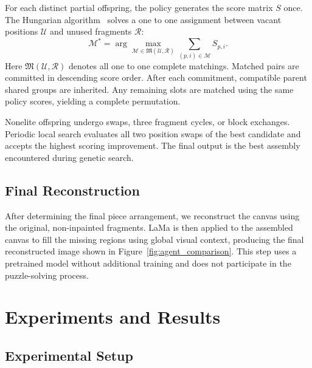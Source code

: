 \documentclass[10pt,twocolumn,letterpaper]{article}
\begin{document}
\par{}
For each distinct partial offspring, the policy generates the score matrix $S$ once. The Hungarian algorithm~\cite{kuhn1955hungarian} solves a one to one assignment between vacant positions $\mathcal U$ and unused fragments $\mathcal R$:
\begin{equation}
\mathcal M^*=\arg\max_{\mathcal M\in\mathfrak M(\mathcal U,\mathcal R)}
\sum_{(p,i)\in\mathcal M}S_{p,i}.
\label{eq:gp-hungarian}
\end{equation}
Here $\mathfrak M(\mathcal U,\mathcal R)$ denotes all one to one complete matchings. Matched pairs are committed in descending score order. After each commitment, compatible parent shared groups are inherited. Any remaining slots are matched using the same policy scores, yielding a complete permutation.

\par{}
Nonelite offspring undergo swaps, three fragment cycles, or block exchanges. Periodic local search evaluates all two position swaps of the best candidate and accepts the highest scoring improvement. The final output is the best assembly encountered during genetic search.

\subsection{Final Reconstruction}
After determining the final piece arrangement, we reconstruct the canvas using the original, non-inpainted fragments. LaMa is then applied to the assembled canvas to fill the missing regions using global visual context, producing the final reconstructed image shown in Figure~\ref{fig:agent_comparison}. This step uses a pretrained model without additional training and does not participate in the puzzle-solving process.



\section{Experiments and Results}
\label{sec:experiments}

\subsection{Experimental Setup}
\label{sec:exp-setup}
\end{document}
